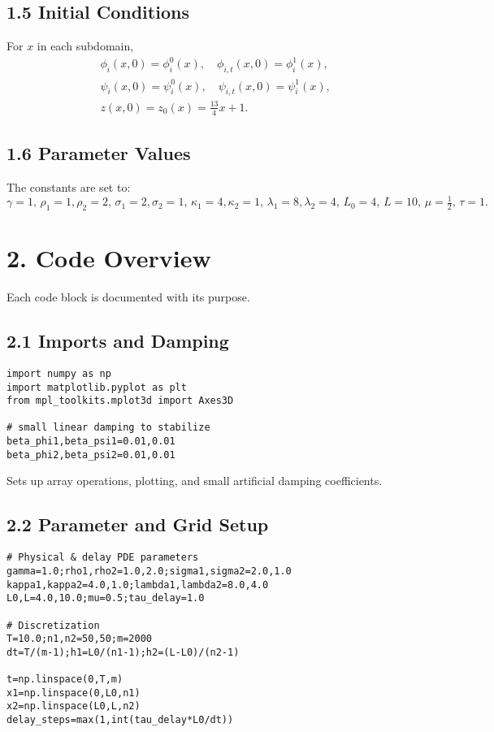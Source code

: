 \documentclass[a4paper,11pt]{article}
\begin{document}
\subsection*{1.5 Initial Conditions}
For \(x\) in each subdomain,
\begin{align*}
&\phi_i(x,0)=\phi_i^0(x), \quad \phi_{i,t}(x,0)=\phi_i^1(x),\\
&\psi_i(x,0)=\psi_i^0(x), \quad \psi_{i,t}(x,0)=\psi_i^1(x),\\
&z(x,0)=z_0(x)=\tfrac{13}{4}x+1.
\end{align*}

\subsection*{1.6 Parameter Values}
The constants are set to:
\[
\gamma = 1,
\,\rho_1=1,\rho_2=2,
\,\sigma_1=2,\sigma_2=1,
\,\kappa_1=4,\kappa_2=1,
\,\lambda_1=8,\lambda_2=4,
\,L_0=4,\,L=10,
\,\mu=\tfrac12,\,\tau=1.
\]

\section*{2. Code Overview}
Each code block is documented with its purpose.

\subsection*{2.1 Imports and Damping}
\begin{verbatim}
import numpy as np
import matplotlib.pyplot as plt
from mpl_toolkits.mplot3d import Axes3D

# small linear damping to stabilize
beta_phi1,beta_psi1=0.01,0.01
beta_phi2,beta_psi2=0.01,0.01
\end{verbatim}
\noindent
Sets up array operations, plotting, and small artificial damping coefficients.

\subsection*{2.2 Parameter and Grid Setup}
\begin{verbatim}
# Physical & delay PDE parameters
gamma=1.0;rho1,rho2=1.0,2.0;sigma1,sigma2=2.0,1.0
kappa1,kappa2=4.0,1.0;lambda1,lambda2=8.0,4.0
L0,L=4.0,10.0;mu=0.5;tau_delay=1.0

# Discretization
T=10.0;n1,n2=50,50;m=2000
dt=T/(m-1);h1=L0/(n1-1);h2=(L-L0)/(n2-1)

t=np.linspace(0,T,m)
x1=np.linspace(0,L0,n1)
x2=np.linspace(L0,L,n2)
delay_steps=max(1,int(tau_delay*L0/dt))
\end{verbatim}
\end{document}
